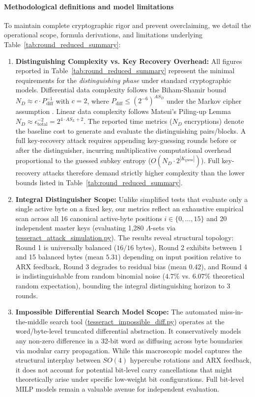 \documentclass[review,12pt]{elsarticle}
\begin{document}
\paragraph{Methodological definitions and model limitations}
To maintain complete cryptographic rigor and prevent overclaiming, we detail the operational scope, formula derivations, and limitations underlying Table~\ref{tab:round_reduced_summary}:
\begin{enumerate}
    \item \textbf{Distinguishing Complexity vs. Key Recovery Overhead:} All figures reported in Table~\ref{tab:round_reduced_summary} represent the minimal requirements for the \emph{distinguishing phase} under standard cryptographic models. Differential data complexity follows the Biham-Shamir bound \cite{biham1991differential} $N_D \approx c \cdot P_{\text{diff}}^{-1}$ with $c=2$, where $P_{\text{diff}} \le (2^{-6})^{AS_D}$ under the Markov cipher assumption \cite{lai1991markov}. Linear data complexity follows Matsui's Piling-up Lemma \cite{matsui1993linear} $N_D \approx \epsilon_{\text{total}}^{-2} = 2^{4 \cdot AS_L + 2}$. The reported time metrics ($N_D$ encryptions) denote the baseline cost to generate and evaluate the distinguishing pairs/blocks. A full key-recovery attack requires appending key-guessing rounds before or after the distinguisher, incurring multiplicative computational overhead proportional to the guessed subkey entropy ($O(N_D \cdot 2^{|K_{\text{guess}}|})$). Full key-recovery attacks therefore demand strictly higher complexity than the lower bounds listed in Table~\ref{tab:round_reduced_summary}.
    \item \textbf{Integral Distinguisher Scope:} Unlike simplified tests that evaluate only a single active byte on a fixed key, our metrics reflect an exhaustive empirical scan across all 16 canonical active-byte positions $i \in \{0, \dots, 15\}$ and 20 independent master keys (evaluating 1,280 $\Lambda$-sets via \url{tesseract_attack_simulation.py}). The results reveal structural topology: Round 1 is universally balanced ($16/16$ bytes), Round 2 exhibits between 1 and 15 balanced bytes (mean $5.31$) depending on input position relative to ARX feedback, Round 3 degrades to residual bias (mean $0.42$), and Round 4 is indistinguishable from random binomial noise ($4.7\%$ vs. $6.07\%$ theoretical random expectation), bounding the integral distinguishing horizon to 3 rounds.
    \item \textbf{Impossible Differential Search Model Scope:} The automated miss-in-the-middle search tool (\url{tesseract_impossible_diff.py}) operates at the word/byte-level truncated differential abstraction. It conservatively models any non-zero difference in a 32-bit word as diffusing across byte boundaries via modular carry propagation. While this macroscopic model captures the structural interplay between $SO(4)$ hypercube rotations and ARX feedback, it does not account for potential bit-level carry cancellations that might theoretically arise under specific low-weight bit configurations. Full bit-level MILP models remain a valuable avenue for independent evaluation.
\end{enumerate}
\end{document}
